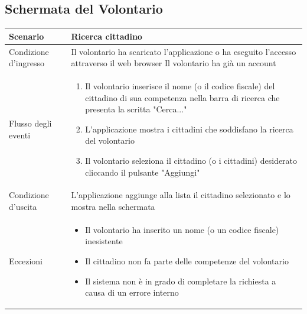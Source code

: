 \documentclass[12pt,a4paper,twoside,openright,titlepage]{book}
\begin{document}
\subsection{Schermata del Volontario}
\begin{table}[H]
\centering
\begin{tabular}{|p{4cm}|p{10cm}|}
\hline
Scenario & Ricerca cittadino \\
\hline
Condizione d'ingresso & Il volontario ha scaricato l'applicazione o ha eseguito l'accesso attraverso il web browser \newline
Il volontario ha già un account \\
\hline
Flusso degli eventi & 
\begin{enumerate}
\item Il volontario inserisce il nome (o il codice fiscale) del cittadino di sua competenza nella barra di ricerca che presenta la scritta "Cerca..."
\item L'applicazione mostra i cittadini che soddisfano la ricerca del volontario
\item Il volontario seleziona il cittadino (o i cittadini) desiderato cliccando il pulsante "Aggiungi"
\end{enumerate}\\
\hline
Condizione d'uscita & L'applicazione aggiunge alla lista il cittadino selezionato e lo mostra nella schermata\\
\hline
Eccezioni & 
\begin{itemize}
\item Il volontario ha inserito un nome (o un codice fiscale) inesistente
\item Il cittadino non fa parte delle competenze del volontario
\item Il sistema non è in grado di completare la richiesta a causa di un errore interno
\end{itemize} \\
\hline
\end{tabular}
\end{table}
\end{document}
